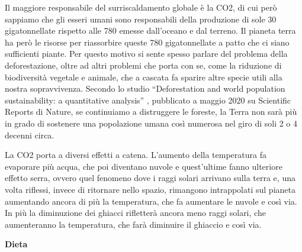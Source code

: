 \documentclass[12pt]{book} %
\begin{document}
Il maggiore responsabile del surriscaldamento globale è la CO2, di cui però sappiamo che gli esseri umani sono responsabili della
produzione di sole 30 gigatonnellate rispetto alle 780 emesse dall'oceano e dal
terreno. Il pianeta terra ha però le risorse per riassorbire queste 780 gigatonnellate a patto che ci siano sufficienti
piante. Per questo motivo si sente spesso parlare del problema della deforestazione, oltre ad altri problemi che porta
con se, come la riduzione di biodiversità vegetale e animale, che a cascata fa sparire altre specie utili alla nostra
sopravvivenza. Secondo lo studio “Deforestation and world population sustainability: a quantitative
analysis” , pubblicato a maggio 2020 su Scientific
Reports di Nature, se continuiamo a distruggere le foreste, la Terra non sarà più in grado di sostenere una popolazione
umana così numerosa nel giro di soli 2 o 4 decenni circa.

La CO2 porta a diversi effetti a catena. L'aumento della temperatura fa evaporare più acqua, che poi
diventano nuvole e quest'ultime fanno ulteriore effetto serra, ovvero quel fenomeno dove i raggi
solari arrivano sulla terra e, una volta riflessi, invece di ritornare nello spazio, rimangono intrappolati
sul pianeta aumentando ancora di più la temperatura, che fa aumentare le nuvole e così via. In più la diminuzione dei ghiacci
rifletterà ancora meno raggi solari, che aumenteranno la temperatura, che farà diminuire il ghiaccio e così via. 

\clearpage
\noindent \textbf{\large Dieta} \\
\end{document}
